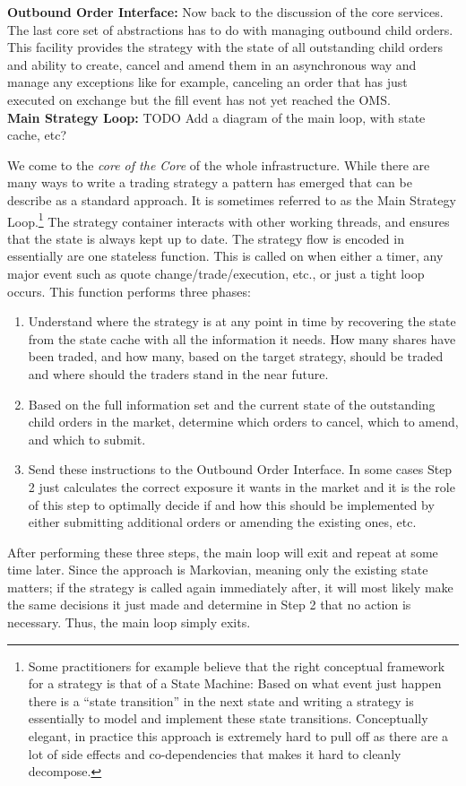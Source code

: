 \noindent\textbf{Outbound Order Interface:} Now back to the discussion of the core services. The last core set of abstractions has to do with managing outbound child orders. This facility provides the strategy with the state of all outstanding child orders and ability to create, cancel and amend them in an asynchronous way and manage any exceptions like for example, canceling an order that has just executed on exchange but the fill event has not yet reached the OMS. \\


\noindent\textbf{Main Strategy Loop:} TODO Add a diagram of the main loop, with state cache, etc?


We come to the \emph{core of the Core} of the whole infrastructure. While there are many ways to write a trading strategy a pattern has emerged that can be describe as a standard approach. It is sometimes referred to as the Main Strategy Loop.\footnote{Some practitioners for example believe that the right conceptual framework for a strategy is that of a State Machine: Based on what event just happen there is a ``state transition'' in the next state and writing a strategy is essentially to model and implement these state transitions. Conceptually elegant, in practice this approach is extremely hard to pull off as there are a lot of side effects and co-dependencies that makes it hard to cleanly decompose.} The strategy container interacts with other working threads, and ensures that the state is always kept up to date. The strategy flow is encoded in essentially are one stateless function. This is called on when either a timer, any major event such as quote change/trade/execution, etc., or just a tight loop occurs. This function performs three phases:
        \begin{enumerate}
        \item Understand where the strategy is at any point in time by recovering the state from the state cache with all the information it needs. How many shares have been traded, and how many, based on the target strategy, should be traded and where should the traders stand in the near future. 
        \item Based on the full information set and the current state of the outstanding child orders in the market, determine which orders to cancel, which to amend, and which to submit.
        \item Send these instructions to the Outbound Order Interface. In some cases Step 2 just calculates the correct exposure it wants in the market and it is the role of this step to optimally decide if and how this should be implemented by either submitting additional orders or amending the existing ones, etc.
        \end{enumerate}
After performing these three steps, the main loop will exit and repeat at some time later. Since the approach is Markovian, meaning only the existing state matters; if the strategy is called again immediately after, it will most likely make the same decisions it just made and determine in Step 2 that no action is necessary. Thus, the main loop simply exits. \\


